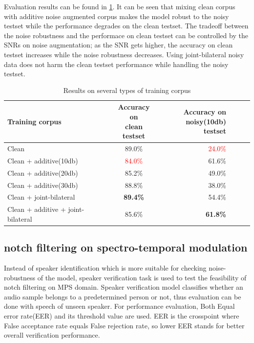 \documentclass[10pt,twocolumn,letterpaper]{article}
\begin{document}
Evaluation results can be found in \cref{tab:spatial}. It can be seen that mixing clean corpus with 
additive noise augmented corpus makes the model robust to the noisy testset while the performance degrades on the clean testset.
The tradeoff between the noise robustness and the performace on clean testset can be controlled by the 
SNRs on noise augmentation; as the SNR gets higher, the accuracy on clean testset increases while the noise robustness decreases.
Using joint-bilateral noisy data does not harm the clean testset performance while handling the noisy testset.

\begin{table}
   \centering
   \begin{tabular}{@{}lcr@{}lcr@{}}
     \toprule
     Training corpus & \makecell{Accuracy on \\ clean testset} & \makecell{Accuracy on \\ noisy(10db) testset} \\
     \midrule
     Clean & 89.0\% & \textcolor{red}{24.0\%} \\
     Clean + additive(10db) & \textcolor{red}{84.0\%} & 61.6\% \\
     Clean + additive(20db) & 85.2\% & 49.0\% \\
     Clean + additive(30db) & 88.8\% & 38.0\% \\
     Clean + joint-bilateral & \textbf{89.4\%} & 54.4\% \\
     Clean + additive + joint-bilateral & 85.6\% & \textbf{61.8\%} \\
     \bottomrule
   \end{tabular}
   \caption{Results on several types of training corpus}
   \label{tab:spatial}
\end{table}

\subsection{notch filtering on spectro-temporal modulation}
Instead of speaker identification which is more suitable for checking noise-robustness of the model,
speaker verification task is used to test the feasibility of notch filtering on MPS domain.
Speaker verification model classifies whether an audio sample belongs to a predetermined person or not,
thus evaluation can be done with speech of unseen speaker.
For performance evaluation, Both Equal error rate(EER) and its threshold value are used. 
EER is the crosspoint where False acceptance rate equals False rejection rate, so lower EER 
stands for better overall verification performance.
\end{document}
